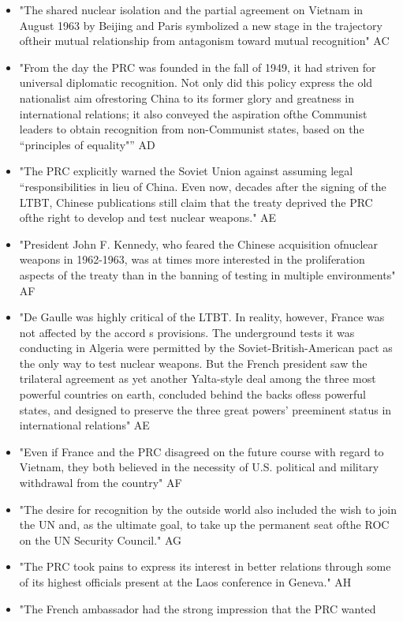 \documentclass[letterpaper]{article}
\begin{document}
\begin{itemize}
\item "The shared nuclear isolation and the partial agreement on Vietnam in
August 1963 by Beijing and Paris symbolized a new stage in the
trajectory oftheir mutual relationship from antagonism toward mutual
recognition" AC
\item "From the day the PRC was founded in the fall of 1949, it had striven
for universal diplomatic recognition. Not only did this policy express
the old nationalist aim ofrestoring China to its former glory and
greatness in international relations; it also conveyed the aspiration
ofthe Communist leaders to obtain recognition from non-Communist
states, based on the “principles of equality"” AD
\item "The PRC explicitly warned the Soviet Union against assuming legal
“responsibilities in lieu of China. Even now, decades after the
signing of the LTBT, Chinese publications still claim that the treaty
deprived the PRC ofthe right to develop and test nuclear weapons." AE
\item "President John F. Kennedy, who feared the Chinese acquisition
ofnuclear weapons in 1962-1963, was at times more interested in the
proliferation aspects of the treaty than in the banning of testing in
multiple environments" AF
\item "De Gaulle was highly critical of the LTBT. In reality, however,
France was not affected by the accord s provisions. The underground
tests it was conducting in Algeria were permitted by the
Soviet-British-American pact as the only way to test nuclear weapons.
But the French president saw the trilateral agreement as yet another
Yalta-style deal among the three most powerful countries on earth,
concluded behind the backs ofless powerful states, and designed to
preserve the three great powers' preeminent status in international
relations" AE
\item "Even if France and the PRC disagreed on the future course with regard
to Vietnam, they both believed in the necessity of U.S. political and
military withdrawal from the country" AF
\item "The desire for recognition by the outside world also included the
wish to join the UN and, as the ultimate goal, to take up the
permanent seat ofthe ROC on the UN Security Council." AG
\item "The PRC took pains to express its interest in better relations
through some of its highest officials present at the Laos conference
in Geneva." AH
\item "The French ambassador had the strong impression that the PRC wanted

\end{itemize}
\end{document}
